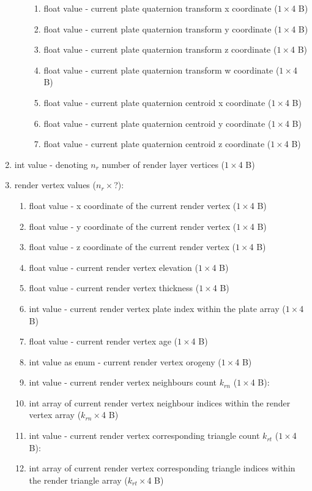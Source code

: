 \begin{enumerate}
\begin{enumerate}
\begin{enumerate}
\item float value - current plate quaternion transform x coordinate ($1\times$4 B)
\item float value - current plate quaternion transform y coordinate ($1\times$4 B)
\item float value - current plate quaternion transform z coordinate ($1\times$4 B)
\item float value - current plate quaternion transform w coordinate ($1\times$4 B)
\item float value - current plate quaternion centroid x coordinate ($1\times$4 B)
\item float value - current plate quaternion centroid y coordinate ($1\times$4 B)
\item float value - current plate quaternion centroid z coordinate ($1\times$4 B)
\end{enumerate}
\end{enumerate}
\item int value - denoting $n_r$ number of render layer vertices ($1\times$4 B)
\item render vertex values ($n_r\times$?):
\begin{enumerate}
\item float value - x coordinate of the current render vertex ($1\times$4 B)
\item float value - y coordinate of the current render vertex ($1\times$4 B)
\item float value - z coordinate of the current render vertex ($1\times$4 B)
\item float value - current render vertex elevation ($1\times$4 B)
\item float value - current render vertex thickness ($1\times$4 B)
\item int value -  current render vertex plate index within the plate array ($1\times$4 B)
\item float value - current render vertex age ($1\times$4 B)
\item int value as enum - current render vertex orogeny ($1\times$4 B)
\item int value - current render vertex neighbours count $k_{rn}$ ($1\times$4 B):
\item int array of current render vertex neighbour indices within the render vertex array ($k_{rn}\times$4 B)
\item int value - current render vertex corresponding triangle count $k_{rt}$ ($1\times$4 B):
\item int array of current render vertex corresponding triangle indices within the render triangle array ($k_{rt}\times$4 B)

\end{enumerate}
\end{enumerate}
